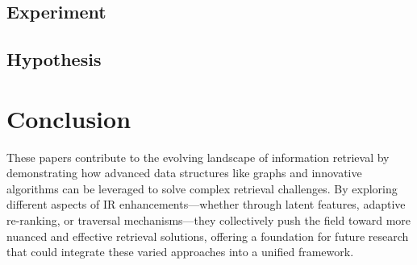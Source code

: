 \documentclass[sigconf,authorversion,nonacm]{acmart}
\begin{document}
\subsection{Experiment}

\subsection{Hypothesis}
\section{Conclusion}

These papers contribute to the evolving landscape of information retrieval by demonstrating how
advanced data structures like graphs and innovative algorithms can be leveraged to solve complex
retrieval challenges. By exploring different aspects of IR enhancements—whether through latent
features, adaptive re-ranking, or traversal mechanisms—they collectively push the field toward more
nuanced and effective retrieval solutions, offering a foundation for future research that could
integrate these varied approaches into a unified framework.

\section*{}


\end{document}
